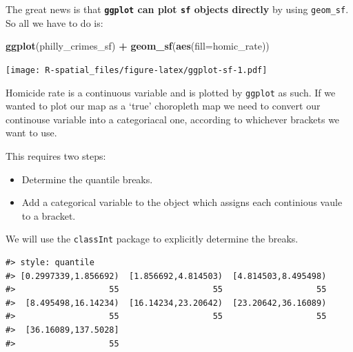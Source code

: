 \documentclass[]{book}
\newenvironment{Shaded}{\begin{snugshade}}{\end{snugshade}}
\newcommand{\KeywordTok}[1]{\textcolor[rgb]{0.13,0.29,0.53}{\textbf{#1}}}
\newcommand{\DataTypeTok}[1]{\textcolor[rgb]{0.13,0.29,0.53}{#1}}
\newcommand{\DecValTok}[1]{\textcolor[rgb]{0.00,0.00,0.81}{#1}}
\newcommand{\StringTok}[1]{\textcolor[rgb]{0.31,0.60,0.02}{#1}}
\newcommand{\CommentTok}[1]{\textcolor[rgb]{0.56,0.35,0.01}{\textit{#1}}}
\newcommand{\OperatorTok}[1]{\textcolor[rgb]{0.81,0.36,0.00}{\textbf{#1}}}
\newcommand{\NormalTok}[1]{#1}
\providecommand{\tightlist}{%
  \setlength{\itemsep}{0pt}\setlength{\parskip}{0pt}}
\begin{document}
The great news is that \textbf{\texttt{ggplot} can plot \texttt{sf}
objects directly} by using \texttt{geom\_sf}. So all we have to do is:

\begin{Shaded}
\begin{Highlighting}[]
\KeywordTok{ggplot}\NormalTok{(philly_crimes_sf) }\OperatorTok{+}\StringTok{ }
\StringTok{  }\KeywordTok{geom_sf}\NormalTok{(}\KeywordTok{aes}\NormalTok{(}\DataTypeTok{fill=}\NormalTok{homic_rate))}
\end{Highlighting}
\end{Shaded}

\texttt{[image: R-spatial\_files/figure-latex/ggplot-sf-1.pdf]}

Homicide rate is a continuous variable and is plotted by \texttt{ggplot}
as such. If we wanted to plot our map as a `true' choropleth map we need
to convert our continouse variable into a categoriacal one, according to
whichever brackets we want to use.

This requires two steps:

\begin{itemize}
\tightlist
\item
  Determine the quantile breaks.
\item
  Add a categorical variable to the object which assigns each continious
  vaule to a bracket.
\end{itemize}

We will use the \texttt{classInt} package to explicitly determine the
breaks.

\begin{Shaded}
\end{Shaded}

\begin{verbatim}
#> style: quantile
#> [0.2997339,1.856692)  [1.856692,4.814503)  [4.814503,8.495498) 
#>                   55                   55                   55 
#>  [8.495498,16.14234)  [16.14234,23.20642)  [23.20642,36.16089) 
#>                   55                   55                   55 
#>  [36.16089,137.5028] 
#>                   55
\end{verbatim}
\end{document}

